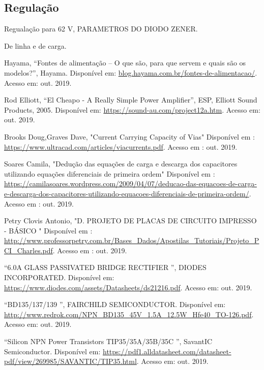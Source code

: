 \documentclass[a4paper,12pt,oneside,openany,table,xcdraw]{article}
\begin{document}
\subsection{Regulação}

Regualação para 62 V, PARAMETROS DO DIODO ZENER.

De linha e de carga.



\newpage
\begin{thebibliography}{9} 

    Hayama,
    “Fontes de alimentação – O que são, para que servem e quais são os modelos?”, Hayama.
 Disponível em:
 \url{blog.hayama.com.br/fontes-de-alimentacao/}. Acesso em: out. 2019.

    Rod Elliott,
    “El Cheapo - A Really Simple Power Amplifier”, ESP, Elliott Sound Products, 2005.
 Disponível em:
 \url{https://sound-au.com/project12a.htm}. Acesso em: out. 2019.
 
    Brooks Doug,Graves Dave,
    "Current Carrying Capacity of Vias"
 Disponível em : 
 \url{https://www.ultracad.com/articles/viacurrents.pdf}. Acesso em : out. 2019.
 
    Soares Camila,
 "Dedução das equações de carga e descarga dos capacitores utilizando equações diferenciais de primeira ordem"
  Disponível em : 
 \url{https://camilasoares.wordpress.com/2009/04/07/deducao-das-equacoes-de-carga-e-descarga-dos-capacitores-utilizando-equacoes-diferenciais-de-primeira-ordem/}.
 Acesso em : out. 2019.
 
    Petry Clovis Antonio,
 "D. PROJETO DE PLACAS DE CIRCUITO
IMPRESSO - BÁSICO "
  Disponível em : 
 \url{http://www.professorpetry.com.br/Bases_Dados/Apostilas_Tutoriais/Projeto_PCI_Charles.pdf}. Acesso em : out. 2019.
 
 
        “6.0A GLASS PASSIVATED BRIDGE RECTIFIER
”, DIODES INCORPORATED.
 Disponível em:
 \url{https://www.diodes.com/assets/Datasheets/ds21216.pdf}. Acesso em: out. 2019.
 
    “BD135/137/139
”, FAIRCHILD SEMICONDUCTOR.
 Disponível em:
 \url{http://www.redrok.com/NPN_BD135_45V_1.5A_12.5W_Hfe40_TO-126.pdf}. Acesso em: out. 2019.
 
    “Silicon NPN Power Transistors TIP35/35A/35B/35C ”, SavantIC Semiconductor. 
 Disponível em:
 \url{https://pdf1.alldatasheet.com/datasheet-pdf/view/269985/SAVANTIC/TIP35.html}. Acesso em: out. 2019.
 


\end{thebibliography}
\end{document}
